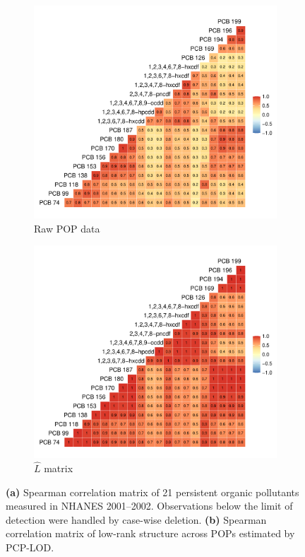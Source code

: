 \begin{landscape}
\begin{figure}
\centering
\begin{subfigure}[b]{0.655\textwidth}
\includegraphics[width=1\linewidth]{./figures/nhanes_raw_corr.pdf}
\caption{Raw POP data}
\label{fig:nhanes_corr}
\end{subfigure}
\hspace{-1em}
\begin{subfigure}[b]{0.655\textwidth}
\includegraphics[width=1\linewidth]{./figures/nhanes_L_corr.pdf}
\caption{$\hat{L}$ matrix}
\label{fig:nhanes_corr_l}
\end{subfigure}
\caption{\textbf{(a)} Spearman correlation matrix of 21 persistent organic pollutants measured in NHANES 2001--2002. Observations below the limit of detection were handled by case-wise deletion. \textbf{(b)} Spearman correlation matrix of low-rank structure across POPs estimated by PCP-LOD.}
\end{figure}
\end{landscape}

